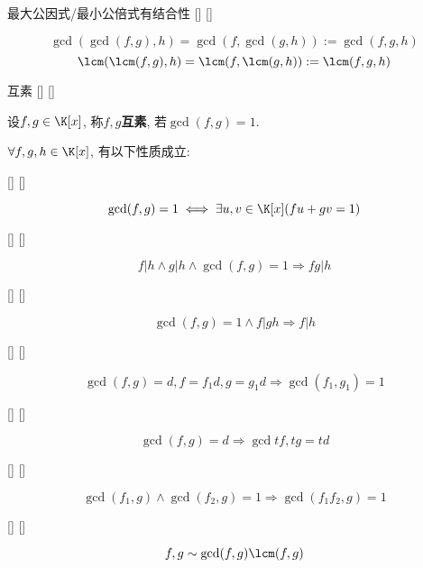 \documentclass[UTF8]{ctexart}
\begin{document}
		\begin{ppt}
			[]
			{最大公因式/最小公倍式有结合性}
			[]
			[]

			\[\gcd(\gcd(f,g),h)=\gcd(f,\gcd(g,h)):=\gcd(f,g,h)\]
			\[\lcm(\lcm(f,g),h)=\lcm(f,\lcm(g,h)):=\lcm(f,g,h)\]
		\end{ppt}
		
		\begin{dfn}
			[]
			{互素}
			[]
			[]

			设$f,g\in\K[x]$, 称$f,g$\textbf{互素}, 若$\gcd(f,g)=1$. 
		\end{dfn}

		$\forall f,g,h\in\K[x]$, 有以下性质成立: 
		
		\begin{ppt}
			[]
			{}
			[]
			[]
			
			\[\gcd(f,g)=1\iff\exists u,v\in\K[x](fu+gv=1)\]
		\end{ppt}
		
		\begin{ppt}
			[]
			{}
			[]
			[]
			
			\[f|h\wedge g|h\wedge\gcd(f,g)=1\Longrightarrow fg|h\]
		\end{ppt}
		
		\begin{ppt}
			[]
			{}
			[]
			[]
			
			\[\gcd(f,g)=1\wedge f|gh\Longrightarrow f|h\]
		\end{ppt}
		
		\begin{ppt}
			[]
			{}
			[]
			[]
			
			\[\gcd(f,g)=d, f=f_1 d, g=g_1 d\Longrightarrow \gcd(f_1,g_1)=1\]
		\end{ppt}
		
		\begin{ppt}
			[]
			{}
			[]
			[]
			
			\[\gcd(f,g)=d\Longrightarrow\gcd{tf,tg}=td\]
		\end{ppt}
		
		\begin{ppt}
			[]
			{}
			[]
			[]
			
			\[\gcd(f_1,g)\wedge\gcd(f_2,g)=1\Longrightarrow\gcd(f_1 f_2,g)=1\]
		\end{ppt}
		
		\begin{ppt}
			[]
			{}
			[]
			[]
			
			\[f,g\sim\gcd(f,g)\lcm(f,g)\]
		\end{ppt}
		
\end{document}
